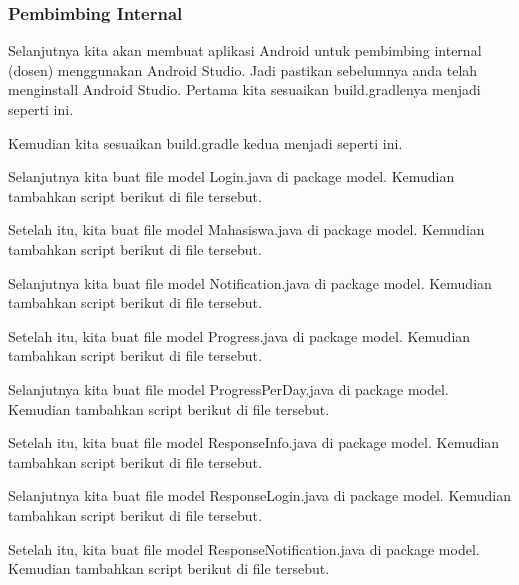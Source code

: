\subsubsection{Pembimbing Internal}

Selanjutnya kita akan membuat aplikasi Android untuk pembimbing internal (dosen) menggunakan Android Studio. Jadi pastikan sebelumnya anda telah menginstall Android Studio. Pertama kita sesuaikan build.gradlenya menjadi seperti ini.


Kemudian kita sesuaikan build.gradle kedua menjadi seperti ini.


Selanjutnya kita buat file model Login.java di package model. Kemudian tambahkan script berikut di file tersebut.


Setelah itu, kita buat file model Mahasiswa.java di package model. Kemudian tambahkan script berikut di file tersebut.


Selanjutnya kita buat file model Notification.java di package model. Kemudian tambahkan script berikut di file tersebut.


Setelah itu, kita buat file model Progress.java di package model. Kemudian tambahkan script berikut di file tersebut.


Selanjutnya kita buat file model ProgressPerDay.java di package model. Kemudian tambahkan script berikut di file tersebut.


Setelah itu, kita buat file model ResponseInfo.java di package model. Kemudian tambahkan script berikut di file tersebut.


Selanjutnya kita buat file model ResponseLogin.java di package model. Kemudian tambahkan script berikut di file tersebut.


Setelah itu, kita buat file model ResponseNotification.java di package model. Kemudian tambahkan script berikut di file tersebut.


